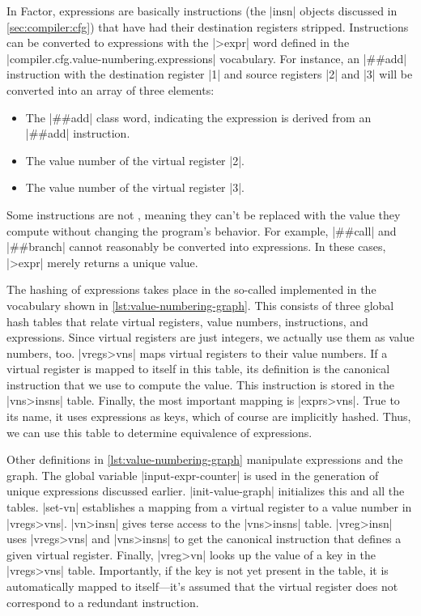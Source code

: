 In Factor, expressions are basically instructions (the \factor|insn| objects
discussed in \cref{sec:compiler:cfg}) that have had their destination registers
stripped.  Instructions can be converted to expressions with the \factor|>expr|
word defined in the \factor|compiler.cfg.value-numbering.expressions|
vocabulary.  For instance, an \factor|##add| instruction with the destination
register \factor|1| and source registers \factor|2| and \factor|3| will be
converted into an array of three elements:
%
\begin{itemize}
%
  \item The \factor|##add| class word, indicating the expression is derived
        from an \factor|##add| instruction.
%
  \item The value number of the virtual register \factor|2|.
%
  \item The value number of the virtual register \factor|3|.
%
\end{itemize}
%
\noindent Some instructions are not , meaning
they can't be replaced with the value they compute without changing the
program's behavior.  For example, \factor|##call| and \factor|##branch| cannot
reasonably be converted into expressions.  In these cases, \factor|>expr|
merely returns a unique value.


The hashing of expressions takes place in the so-called 
implemented in the vocabulary shown in \vref{lst:value-numbering-graph}.  This
consists of three global hash tables that relate virtual registers, value
numbers, instructions, and expressions.  Since virtual registers are just
integers, we actually use them as value numbers, too.  \factor|vregs>vns| maps
virtual registers to their value numbers.  If a virtual register  is mapped to
itself in this table, its definition is the canonical instruction that we use
to compute the value.  This instruction is stored in the \factor|vns>insns| table.  Finally, the most important mapping is \factor|exprs>vns|.  True to its
name, it uses expressions as keys, which of course are implicitly hashed.
Thus, we can use this table to determine equivalence of expressions.

Other definitions in \vref{lst:value-numbering-graph} manipulate expressions
and the graph.  The global variable \factor|input-expr-counter| is used in the
generation of unique expressions discussed earlier.  \factor|init-value-graph|
initializes this and all the tables.  \factor|set-vn| establishes a mapping
from a virtual register to a value number in \factor|vregs>vns|.
\factor|vn>insn| gives terse access to the \factor|vns>insns| table.
\factor|vreg>insn| uses \factor|vregs>vns| and \factor|vns>insns| to get the
canonical instruction that defines a given virtual register.  Finally,
\factor|vreg>vn| looks up the value of a key in the \factor|vregs>vns| table.
Importantly, if the key is not yet present in the table, it is automatically
mapped to itself---it's assumed that the virtual register does not correspond
to a redundant instruction.

